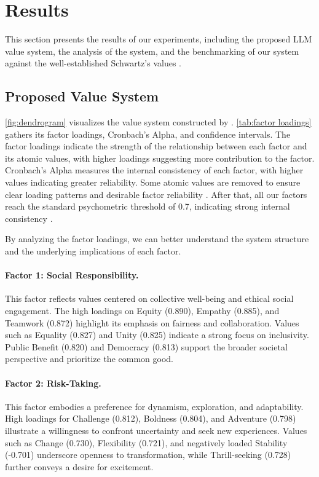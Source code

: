 \section{Results}\label{sec:experiments}

This section presents the results of our experiments, including the proposed LLM value system, the analysis of the system, and the benchmarking of our system against the well-established Schwartz's values \cite{schwartz2012overview}.


\subsection{Proposed Value System}
\cref{fig:dendrogram} visualizes the value system constructed by \our{}.
\cref{tab:factor loadings} gathers its factor loadings, Cronbach's Alpha, and confidence intervals. The factor loadings indicate the strength of the relationship between each factor and its atomic values, with higher loadings suggesting more contribution to the factor. Cronbach's Alpha measures the internal consistency of each factor, with higher values indicating greater reliability. 
Some atomic values are removed to ensure clear loading patterns and desirable factor reliability \cite{aavik2002structure}. After that, all our factors reach the standard psychometric threshold of 0.7, indicating strong internal consistency \cite{taber2018use}.

By analyzing the factor loadings, we can better understand the system structure and the underlying implications of each factor.

\paragraph{Factor 1: Social Responsibility.}
This factor reflects values centered on collective well-being and ethical social engagement. The high loadings on Equity (0.890), Empathy (0.885), and Teamwork (0.872) highlight its emphasis on fairness and collaboration. Values such as Equality (0.827) and Unity (0.825) indicate a strong focus on inclusivity. Public Benefit (0.820) and Democracy (0.813) support the broader societal perspective and prioritize the common good.

\paragraph{Factor 2: Risk-Taking.}
This factor embodies a preference for dynamism, exploration, and adaptability. High loadings for Challenge (0.812), Boldness (0.804), and Adventure (0.798) illustrate a willingness to confront uncertainty and seek new experiences. Values such as Change (0.730), Flexibility (0.721), and negatively loaded Stability (-0.701) underscore openness to transformation, while Thrill-seeking (0.728) further conveys a desire for excitement.

